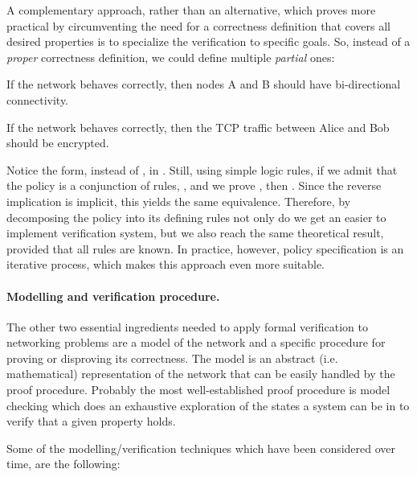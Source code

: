 A complementary approach, rather than an alternative, which proves more
practical by circumventing the need for a correctness definition that covers
all desired properties is to specialize the verification to specific goals.
So, instead of a \emph{proper} correctness definition, we could define multiple
\emph{partial} ones:

\begin{definition}
If the network behaves correctly, then nodes A and B should have bi-directional
connectivity.
\end{definition}

\begin{definition}
If the network behaves correctly, then the TCP traffic between Alice and Bob
should be encrypted.
\end{definition}

Notice the  form, instead of
, in
.  Still, using simple logic
rules, if we admit that the policy is a conjunction of rules,
, and we prove
, then
.  Since the reverse implication is implicit,
this yields the same equivalence.  Therefore, by decomposing the policy into
its defining rules not only do we get an easier to implement verification
system, but we also reach the same theoretical result, provided that all rules
are known.  In practice, however, policy specification is an iterative process,
which makes this approach even more suitable.

\paragraph{Modelling and verification procedure.}
The other two essential ingredients needed to apply formal verification to
networking problems are a model of the network and a specific procedure for
proving or disproving its correctness.  The model is an abstract (i.e.
mathematical) representation of the network that can be easily handled by the
proof procedure.  Probably the most well-established proof procedure is model
checking \cite{clarke1999model} which does an exhaustive exploration of the
states a system can be in to verify that a given property holds.

Some of the modelling/verification techniques which have been considered over
time, are the following:

